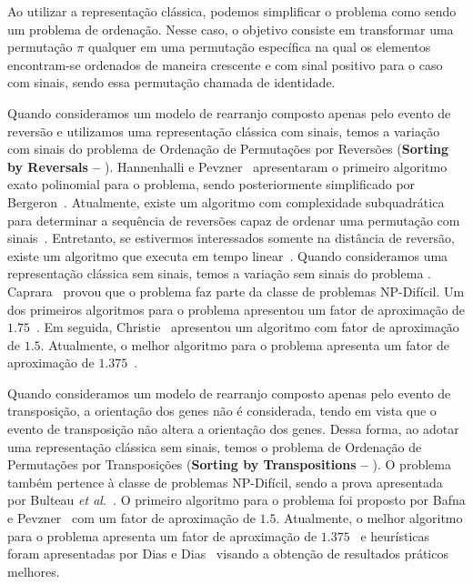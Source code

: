 Ao utilizar a representação clássica, podemos simplificar o problema como sendo um problema de ordenação. Nesse caso, o objetivo consiste em transformar uma permutação $\pi$ qualquer em uma permutação específica na qual os elementos encontram-se ordenados de maneira crescente e com sinal positivo para o caso com sinais, sendo essa permutação chamada de identidade.

Quando consideramos um modelo de rearranjo composto apenas pelo evento de reversão e utilizamos uma representação clássica com sinais, temos a variação com sinais do problema de Ordenação de Permutações por Reversões (\textbf{Sorting by Reversals --} \SbR). Hannenhalli e Pevzner~\cite{1999-hannenhalli-pevzner} apresentaram o primeiro algoritmo exato polinomial para o problema, sendo posteriormente simplificado por Bergeron~\cite{2005-bergeron}. Atualmente, existe um algoritmo com complexidade subquadrática para determinar a sequência de reversões capaz de ordenar uma permutação com sinais~\cite{2007-tannier-etal}. Entretanto, se estivermos interessados somente na distância de reversão, existe um algoritmo que executa em tempo linear~\cite{2001-bader-etal}. Quando consideramos uma representação clássica sem sinais, temos a variação sem sinais do problema \SbR. Caprara~\cite{1999a-caprara} provou que o problema faz parte da classe de problemas NP-Difícil. Um dos primeiros algoritmos para o problema apresentou um fator de aproximação de $1.75$~\cite{1996-bafna-pevzner}. Em seguida, Christie~\cite{1998a-christie} apresentou um algoritmo com fator de aproximação de $1.5$. Atualmente, o melhor algoritmo para o problema apresenta um fator de aproximação de $1.375$~\cite{2002-berman-etal}.

Quando consideramos um modelo de rearranjo composto apenas pelo evento de transposição, a orientação dos genes não é considerada, tendo em vista que o evento de transposição não altera a orientação dos genes. Dessa forma, ao adotar uma representação clássica sem sinais, temos o problema de Ordenação de Permutações por Transposições (\textbf{Sorting by Transpositions --} \SbT). O problema também pertence à classe de problemas NP-Difícil, sendo a prova apresentada por Bulteau \textit{et al.}~\cite{2012-bulteau-etal}. O primeiro algoritmo para o problema foi proposto por Bafna e Pevzner~\cite{1998-bafna-pevzner} com um fator de aproximação de $1.5$. Atualmente, o melhor algoritmo para o problema apresenta um fator de aproximação de $1.375$~\cite{2006-elias-hartman,2022-silva-etal} e heurísticas foram apresentadas por Dias e Dias~\cite{2010c-dias-dias} visando a obtenção de resultados práticos melhores. 

